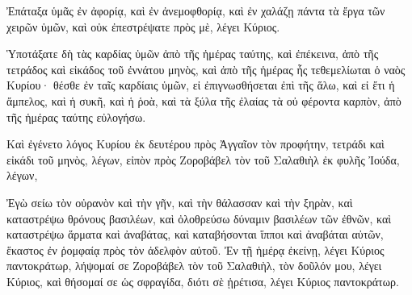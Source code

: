 {Ἐπάταξα ὑμᾶς ἐν ἀφορίᾳ, καὶ ἐν ἀνεμοφθορίᾳ, καὶ ἐν χαλάζῃ πάντα τὰ ἔργα τῶν χειρῶν ὑμῶν, καὶ οὐκ ἐπεστρέψατε πρὸς μὲ, λέγει Κύριος.
\par }{\PP {}Ὑποτάξατε δὴ τὰς καρδίας ὑμῶν ἀπὸ τῆς ἡμέρας ταύτης, καὶ ἐπέκεινα, ἀπὸ τῆς τετράδος καὶ εἰκάδος τοῦ ἐννάτου μηνὸς, καὶ ἀπὸ τῆς ἡμέρας ἧς τεθεμελίωται ὁ ναὸς Κυρίου· θέσθε ἐν ταῖς καρδίαις ὑμῶν,
εἰ ἐπιγνωσθήσεται ἐπὶ τῆς ἅλω, καὶ εἰ ἔτι ἡ ἄμπελος, καὶ ἡ συκῆ, καὶ ἡ ῥοὰ, καὶ τὰ ξύλα τῆς ἐλαίας τὰ οὐ φέροντα καρπὸν, ἀπὸ τῆς ἡμέρας ταύτης εὐλογήσω.
\par }{\PP {}Καὶ ἐγένετο λόγος Κυρίου ἐκ δευτέρου πρὸς Ἀγγαῖον τὸν προφήτην, τετράδι καὶ εἰκάδι τοῦ μηνὸς, λέγων,
εἰπὸν πρὸς Ζοροβάβελ τὸν τοῦ Σαλαθιὴλ ἐκ φυλῆς Ἰούδα, λέγων,
\par }{\PP Ἐγὼ σείω τὸν οὐρανὸν καὶ τὴν γῆν, καὶ τὴν θάλασσαν καὶ τὴν ξηρὰν,
καὶ καταστρέψω θρόνους βασιλέων, καὶ ὀλοθρεύσω δύναμιν βασιλέων τῶν ἐθνῶν, καὶ καταστρέψω ἅρματα καὶ ἀναβάτας, καὶ καταβήσονται ἵπποι καὶ ἀναβάται αὐτῶν, ἕκαστος ἐν ῥομφαίᾳ πρὸς τὸν ἀδελφὸν αὐτοῦ.
Ἐν τῇ ἡμέρᾳ ἐκείνῃ, λέγει Κύριος παντοκράτωρ, λήψομαί σε Ζοροβάβελ τὸν τοῦ Σαλαθιὴλ, τὸν δοῦλόν μου, λέγει Κύριος, καὶ θήσομαί σε ὡς σφραγίδα, διότι σὲ ᾑρέτισα, λέγει Κύριος παντοκράτωρ.
\par }